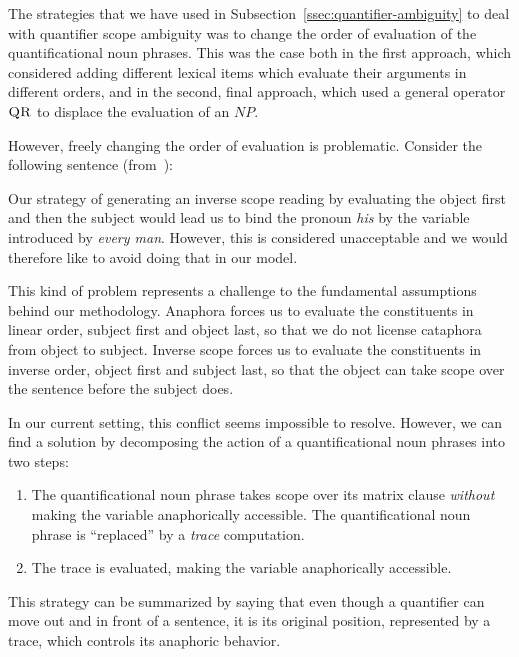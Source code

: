 The strategies that we have used in
Subsection~\ref{ssec:quantifier-ambiguity} to deal with quantifier scope
ambiguity was to change the order of evaluation of the quantificational
noun phrases. This was the case both in the first approach, which
considered adding different lexical items which evaluate their arguments in
different orders, and in the second, final approach, which used a general
operator $\textsc{QR}$ to displace the evaluation of an $NP$.

However, freely changing the order of evaluation is problematic. Consider
the following sentence (from~\cite{shan2006explaining}):

\begin{exe}
\end{exe}

Our strategy of generating an inverse scope reading by evaluating the
object first and then the subject would lead us to bind the pronoun
\emph{his} by the variable introduced by \emph{every man}. However, this is
considered unacceptable and we would therefore like to avoid doing that in
our model.

This kind of problem represents a challenge to the fundamental assumptions
behind our methodology. Anaphora forces us to evaluate the constituents in
linear order, subject first and object last, so that we do not license
cataphora from object to subject. Inverse scope forces us to evaluate the
constituents in inverse order, object first and subject last, so that the
object can take scope over the sentence before the subject does.

In our current setting, this conflict seems impossible to resolve. However,
we can find a solution by decomposing the action of a quantificational noun
phrases into two steps:

\begin{enumerate}
\item The quantificational noun phrase takes scope over its matrix clause
  \emph{without} making the variable anaphorically accessible. The
  quantificational noun phrase is ``replaced'' by a \emph{trace}
  computation.
\item The trace is evaluated, making the variable anaphorically accessible.
\end{enumerate}

This strategy can be summarized by saying that even though a quantifier can
move out and in front of a sentence, it is its original position,
represented by a trace, which controls its anaphoric behavior.

